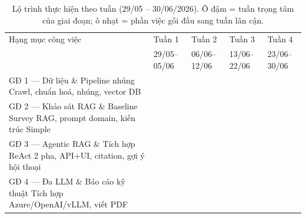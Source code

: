 \documentclass[11pt]{article}
\begin{document}
\begin{table}[H]
\centering
\small
\renewcommand{\arraystretch}{1.65}
\setlength{\tabcolsep}{4pt}
\begin{tabular}{@{}p{5.7cm}P{2.25cm}P{2.25cm}P{2.25cm}P{2.25cm}@{}}
\toprule
Hạng mục công việc & Tuần 1 & Tuần 2 & Tuần 3 & Tuần 4 \\
 & {\scriptsize 29/05--05/06} & {\scriptsize 06/06--12/06} & {\scriptsize 13/06--22/06} & {\scriptsize 23/06--30/06} \\
\midrule

GĐ 1 — Dữ liệu \& Pipeline nhúng \newline
{\scriptsize Crawl, chuẩn hoá, nhúng, vector DB} &
 &  &  &  \\
\midrule

GĐ 2 — Khảo sát RAG \& Baseline \newline
{\scriptsize Survey RAG, prompt domain, kiến trúc Simple} &
 &  &  &  \\
\midrule

GĐ 3 — Agentic RAG \& Tích hợp \newline
{\scriptsize ReAct 2 pha, API+UI, citation, gợi ý hội thoại} &
 &  &  &  \\
\midrule

GĐ 4 — Đa LLM \& Báo cáo kỹ thuật \newline
{\scriptsize Tích hợp Azure/OpenAI/vLLM, viết PDF} &
 &  &  &  \\

\bottomrule
\end{tabular}
\caption{Lộ trình thực hiện theo tuần (29/05 -- 30/06/2026). Ô đậm = tuần trọng tâm của giai đoạn; ô nhạt = phần việc gối đầu sang tuần lân cận.}
\label{tab:roadmap}
\end{table}
\end{document}

